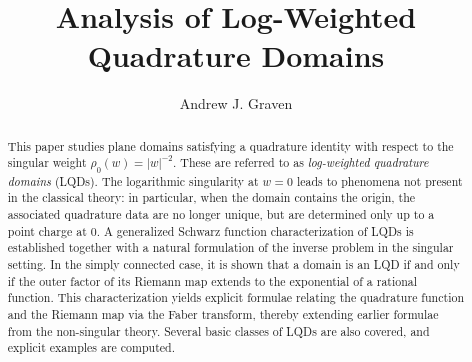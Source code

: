 \documentclass{article}
\title{Analysis of Log-Weighted Quadrature Domains}
\author{Andrew J. Graven}
\date{\vspace{-4ex}}
\numberwithin{equation}{section}
\begin{document}
\maketitle



\begin{abstract}
This paper studies plane domains satisfying a quadrature identity with respect to the singular weight $\rho_0(w)=|w|^{-2}$. These are referred to as \emph{log-weighted quadrature domains} (LQDs). The logarithmic singularity at $w=0$ leads to phenomena not present in the classical theory: in particular, when the domain contains the origin, the associated quadrature data are no longer unique, but are determined only up to a point charge at $0$. A generalized Schwarz function characterization of LQDs is established together with a natural formulation of the inverse problem in the singular setting. In the simply connected case, it is shown that a domain is an LQD if and only if the outer factor of its Riemann map extends to the exponential of a rational function. This characterization yields explicit formulae relating the quadrature function and the Riemann map via the Faber transform, thereby extending earlier formulae from the non-singular theory. Several basic classes of LQDs are also covered, and explicit examples are computed.
\end{abstract}
\end{document}
